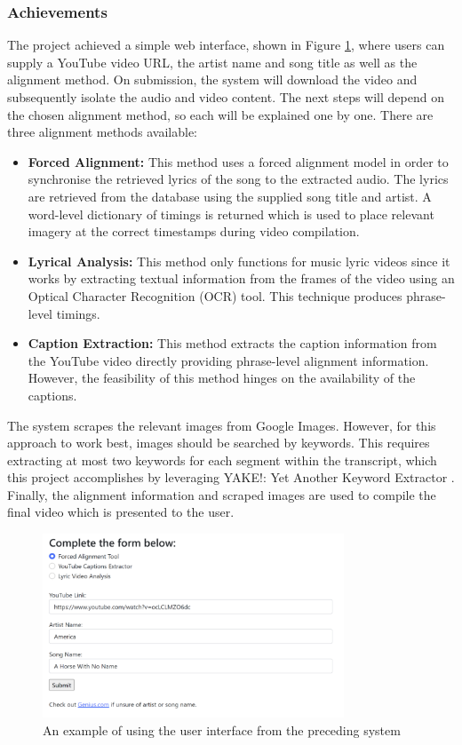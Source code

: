 \documentclass{l4proj}
\begin{document}
\subsubsection{Achievements}
The project achieved a simple web interface, shown in Figure \ref{fig:parker_interface}, where users can supply a YouTube video URL, the artist name and song title as well as the alignment method. On submission, the system will download the video and subsequently isolate the audio and video content. The next steps will depend on the chosen alignment method, so each will be explained one by one. There are three alignment methods available:
\begin{itemize}
    \item \textbf{Forced Alignment:} This method uses a forced alignment model in order to synchronise the retrieved lyrics of the song to the extracted audio. The lyrics are retrieved from the \cite{genius} database using the supplied song title and artist. A word-level dictionary of timings is returned which is used to place relevant imagery at the correct timestamps during video compilation.

    \item \textbf{Lyrical Analysis:} This method only functions for music lyric videos since it works by extracting textual information from the frames of the video using an Optical Character Recognition (OCR) tool. This technique produces phrase-level timings.

    \item \textbf{Caption Extraction:} This method extracts the caption information from the YouTube video directly providing phrase-level alignment information. However, the feasibility of this method hinges on the availability of the captions.
\end{itemize}

The system scrapes the relevant images from Google Images. However, for this approach to work best, images should be searched by keywords. This requires extracting at most two keywords for each segment within the transcript, which this project accomplishes by leveraging YAKE!: Yet Another Keyword Extractor \citep{campos2020yake}. Finally, the alignment information and scraped images are used to compile the final video which is presented to the user.

\begin{figure}[H]
    \centering
    \includegraphics[width=0.8\textwidth]{figures/parker_interface.pdf}
    \caption{An example of using the user interface from the preceding system}
    \label{fig:parker_interface}
\end{figure}
\end{document}
